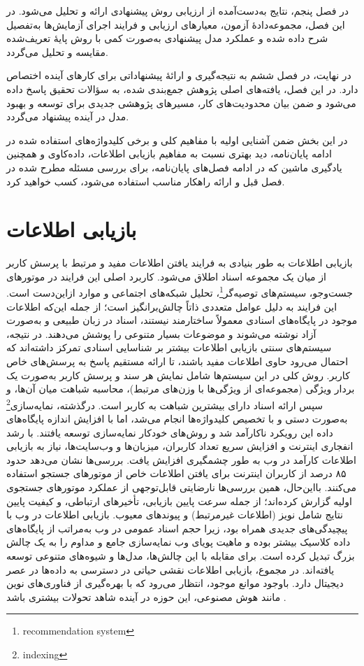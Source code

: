 در فصل پنجم، نتایج به‌دست‌آمده از ارزیابی روش پیشنهادی ارائه و تحلیل می‌شود. در این فصل، مجموعه‌دادهٔ آزمون، معیارهای ارزیابی و فرایند اجرای آزمایش‌ها به‌تفصیل شرح داده شده و عملکرد مدل پیشنهادی به‌صورت کمی با روش پایهٔ تعریف‌شده مقایسه و تحلیل می‌گردد.

در نهایت، در فصل ششم به نتیجه‌گیری و ارائهٔ پیشنهاداتی برای کارهای آینده اختصاص دارد. در این فصل، یافته‌های اصلی پژوهش جمع‌بندی شده، به سؤالات تحقیق پاسخ داده می‌شود و ضمن بیان محدودیت‌های کار، مسیرهای پژوهشی جدیدی برای توسعه و بهبود مدل در آینده پیشنهاد می‌گردد.


در این بخش ضمن‌ آشنایی اولیه با مفاهیم کلی و برخی کلیدواژه‌های استفاده شده در ادامه پایان‌نامه، دید بهتری نسبت به مفاهیم بازیابی اطلاعات، داده‌کاوی و همچنین یادگیری ماشین که در ادامه فصل‌های پایان‌نامه، برای بررسی مسئله مطرح شده در فصل قبل و ارائه راهکار مناسب استفاده می‌شود، کسب‌ خواهید کرد.

\section{بازیابی اطلاعات}
بازیابی اطلاعات به طور بنیادی به فرایند یافتن اطلاعات مفید و مرتبط با پرسش کاربر از میان یک مجموعه اسناد اطلاق می‌شود. کاربرد اصلی این فرایند در موتورهای جست‌وجو، سیستم‌های توصیه‌گر\footnote{recommendation system}، تحلیل شبکه‌های اجتماعی و موارد ازاین‌دست است. این فرایند به دلیل عوامل متعددی ذاتاً چالش‌برانگیز است؛ از جمله این‌که اطلاعات موجود در پایگاه‌های اسنادی معمولاً ساختارمند نیستند، اسناد در زبان طبیعی و به‌صورت آزاد نوشته می‌شوند و موضوعات بسیار متنوعی را پوشش می‌دهند. در نتیجه، سیستم‌های سنتی بازیابی اطلاعات بیشتر بر شناسایی اسنادی تمرکز داشته‌اند که احتمال می‌رود حاوی اطلاعات مفید باشند، تا ارائه مستقیم پاسخ به پرسش‌های خاص کاربر. روش کلی در این سیستم‌ها شامل نمایش هر سند و پرسش کاربر به‌صورت یک بردار ویژگی (مجموعه‌ای از ویژگی‌ها با وزن‌های مرتبط)، محاسبه شباهت میان آن‌ها، و سپس ارائه اسناد دارای بیشترین شباهت به کاربر است. درگذشته، نمایه‌سازی\footnote{indexing} به‌صورت دستی و با تخصیص کلیدواژه‌ها انجام می‌شد، اما با افزایش اندازه پایگاه‌های داده این رویکرد ناکارآمد شد و روش‌های خودکار نمایه‌سازی توسعه یافتند. با رشد انفجاری اینترنت و افزایش سریع تعداد کاربران، میزبان‌ها و وب‌سایت‌ها، نیاز به بازیابی اطلاعات کارآمد در وب به طور چشمگیری افزایش یافت. بررسی‌ها نشان می‌دهد حدود ۸۵ درصد از کاربران اینترنت برای یافتن اطلاعات خاص از موتورهای جستجو استفاده می‌کنند. بااین‌حال، همین بررسی‌ها نارضایتی قابل‌توجهی از عملکرد موتورهای جستجوی اولیه گزارش کرده‌اند؛ از جمله سرعت پایین بازیابی، تأخیرهای ارتباطی، و کیفیت پایین نتایج شامل نویز (اطلاعات غیرمرتبط) و پیوندهای معیوب. بازیابی اطلاعات در وب با پیچیدگی‌های جدیدی همراه بود، زیرا حجم اسناد عمومی در وب به‌مراتب از پایگاه‌های داده کلاسیک بیشتر بوده و ماهیت پویای وب نمایه‌سازی جامع و مداوم را به یک چالش بزرگ تبدیل کرده است. برای مقابله با این چالش‌ها، مدل‌ها و شیوه‌های متنوعی توسعه یافته‌اند.
 در مجموع، بازیابی اطلاعات نقشی حیاتی در دسترسی به داده‌ها در عصر دیجیتال دارد. باوجود موانع موجود، انتظار می‌رود که با بهره‌گیری از فناوری‌های نوین مانند هوش مصنوعی، این حوزه در آینده شاهد تحولات بیشتری باشد \cite{kobayashi_information_2000} \cite{ghorab_personalised_2013} \cite{mitra_information_2000}.
